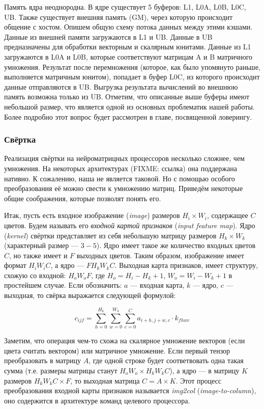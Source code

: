Память ядра неоднородна. В ядре существует 5 буферов:
L1, L0A, L0B, L0C, UB. Также существует внешняя память (GM), через которую
происходит общение с хостом. Опишем общую схему потока данных между этими кэшами.
Данные из внешней памяти загружаются в L1 и UB. Данные в UB предназначены для
обработки векторным и скалярным юнитами. Данные из L1 загружаются в L0A и L0B,
которые соответствуют матрицам A и B матричного умножения. Результат после
перемножения (которое, как было упомянуто раньше, выполняется матричным юнитом),
попадает в буфер L0C, из которого происходит данные отправляются в UB. Выгрузка
результата вычислений во внешнюю память возможна только из UB. Отметим, что
описанные выше буферы имеют небольшой размер, что является одной из основных
проблематик нашей работы. Более подробно этот вопрос будет рассмотрен в главе,
посвященной ловерингу.

\subsubsection{Свёртка}

Реализация свёртки на нейроматрицных процессоров несколько сложнее, чем умножения.
На некоторых архитектурах (FIXME: ссылка) она поддержана нативно. К сожалению, наша
не является таковой. Но с помощью особого преобразования её можно свести к 
умножению матриц. Приведём некоторые общие соображения, которые позволят понять его.

Итак, пусть есть входное изображение (\textit{image}) размеров $H_i \times W_i$,
содержащее $C$ цветов. Будем называть его \textit{входной картой признаков}
(\textit{input feature map}). Ядро (\textit{kernel}) свёртки представляет из
себя небольшую матрицу размеров $H_k \times W_k$ (характерный размер --- $3-5$).
Ядро имеет такое же количество входных цветов $C$, но также имеет и $F$
выходных цветов. Таким образом, изображение имеет формат $H_i W_i C$,
а ядро --- $F H_k W_k C$. Выходная карта признаков, имеет структуру, схожую
со входной: $H_o W_o F$, где $H_o = H_i - H_k + 1$, $W_o = W_i - W_k + 1$
в простейшем случае. Если обозначить: $a$ --- входная карта, $k$ --- ядро,
$c$ --- выходная, то свёрка выражается следующей формулой:

\[
    c_{ijf} = \sum \limits_{h = 0}^{H_k} \sum \limits_{w = 0}^{W_k}
              \sum \limits_{c = 0}^{C} a_{i+h, j+w, c} \cdot k_{f h w c}
\]

Заметим, что операция чем-то схожа на скалярное умножение векторов
(если цвета считать вектором) или матричное умножение. Если первый тензор
преобразовать в матрицу $A$, где одной строке будет соответвовать одна
такая сумма (т.е. размеры матрицы станут $H_o W_o \times H_k W_k C$), а
ядро --- в матрицу $K$ размеров $H_k W_k C \times F$, то выходная
матрица $C = A \times K$. Этот процесс преобразования входной карты
признаков называется \textit{img2col} (\textit{image-to-column}),
оно содержится в архитектуре команд целевого процессора.

